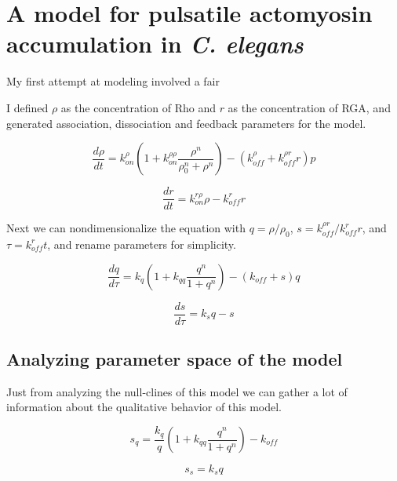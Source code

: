 \section{A model for pulsatile actomyosin accumulation in \textit{C. elegans} }

My first attempt at modeling involved a fair

I defined $\rho$ as the concentration of Rho and $r$ as the concentration of RGA, and generated association, dissociation and feedback parameters for the model. 

\begin{equation}
\label{eqn:rho_1}
	\frac{d\rho}{dt} = k_{on}^\rho \left( 1+k_{on}^{\rho\rho} \frac{\rho^n}{\rho_0^n +\rho^n} \right ) - (k_{off}^\rho + k_{off}^{\rho r} r) p
\end{equation}

\begin{equation}
\label{eqn:rga_1}
	\frac{dr}{dt} = k_{on}^{r \rho}\rho - k_{off}^r r 
\end{equation}

Next we can nondimensionalize the equation with $q=\rho/\rho_0$, $s=k_{off}^{\rho r}/k_{off}^r r$, and $\tau=k_{off}^r t$, and rename parameters for simplicity.

\begin{equation}
	\frac{dq}{d\tau} = k_q \left( 1+k_{qq} \frac{q^n}{1 +q^n} \right ) - (k_{off} + s) q
\end{equation}

\begin{equation}
	\frac{ds}{d\tau} = k_s q - s
\end{equation}




\subsection{Analyzing parameter space of the model}


Just from analyzing the null-clines of this model we can gather a lot of information about the qualitative behavior of this model.  

\begin{equation}
	s_q =\frac{k_q}{q} \left( 1+k_{qq} \frac{q^n}{1 +q^n} \right ) - k_{off} 
\end{equation}

\begin{equation}
	s_s = k_s q
\end{equation}

